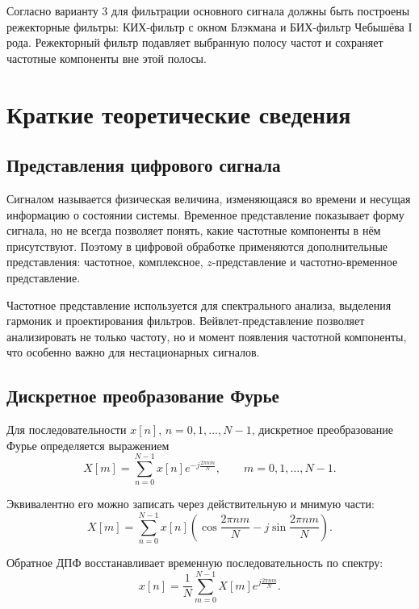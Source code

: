 \documentclass[a4paper,12pt]{article}
\begin{document}
Согласно варианту 3 для фильтрации основного сигнала должны быть построены режекторные фильтры: КИХ-фильтр с окном Блэкмана и БИХ-фильтр Чебышёва I рода. Режекторный фильтр подавляет выбранную полосу частот и сохраняет частотные компоненты вне этой полосы.

\section{Краткие теоретические сведения}

\subsection{Представления цифрового сигнала}

Сигналом называется физическая величина, изменяющаяся во времени и несущая информацию о состоянии системы. Временное представление показывает форму сигнала, но не всегда позволяет понять, какие частотные компоненты в нём присутствуют. Поэтому в цифровой обработке применяются дополнительные представления: частотное, комплексное, $z$-представление и частотно-временное представление.

Частотное представление используется для спектрального анализа, выделения гармоник и проектирования фильтров. Вейвлет-представление позволяет анализировать не только частоту, но и момент появления частотной компоненты, что особенно важно для нестационарных сигналов.

\subsection{Дискретное преобразование Фурье}

Для последовательности $x[n]$, $n=0,1,\ldots,N-1$, дискретное преобразование Фурье определяется выражением
\begin{equation}
    X[m] = \sum_{n=0}^{N-1} x[n] e^{-j\frac{2\pi nm}{N}}, \qquad m=0,1,\ldots,N-1.
    \label{eq:dft}
\end{equation}

Эквивалентно его можно записать через действительную и мнимую части:
\begin{equation}
    X[m] = \sum_{n=0}^{N-1} x[n]\left(\cos\frac{2\pi nm}{N} - j\sin\frac{2\pi nm}{N}\right).
\end{equation}

Обратное ДПФ восстанавливает временную последовательность по спектру:
\begin{equation}
    x[n] = \frac{1}{N}\sum_{m=0}^{N-1} X[m] e^{j\frac{2\pi nm}{N}}.
    \label{eq:idft}
\end{equation}
\end{document}
